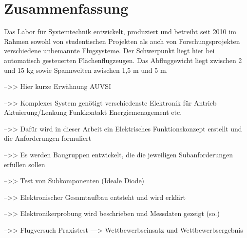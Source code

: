 \chapter*{Zusammenfassung}

Das Labor für Systemtechnik entwickelt, produziert und betreibt seit 2010 im Rahmen sowohl von studentischen Projekten als auch von Forschungsprojekten verschiedene unbemannte Flugsysteme.
Der Schwerpunkt liegt hier bei automatisch gesteuerten Flächenflugzeugen.
Das Abfluggewicht liegt zwischen 2 und 15 kg sowie Spannweiten zwischen 1,5 m und 5 m.

-->> Hier kurze Erwähnung AUVSI 

-->> Komplexes System genötigt verschiedenste Elektronik für Antrieb Aktuierung/Lenkung Funkkontakt Energiemenagement etc.

-->> Dafür wird in dieser Arbeit ein Elektrisches Funktionskonzept erstellt und die Anforderungen formuliert

-->> Es werden Baugruppen entwickelt, die die jeweiligen Subanforderungen erfüllen sollen

-->> Test von Subkomponenten (Ideale Diode)

-->> Elektronischer Gesamtaufbau entsteht und wird erklärt

-->> Elektronikerprobung wird beschrieben und Messdaten gezeigt (so.)

-->> Flugversuch Praxistest ---> Wettbewerbseinsatz und Wettbewerbsergebnis


